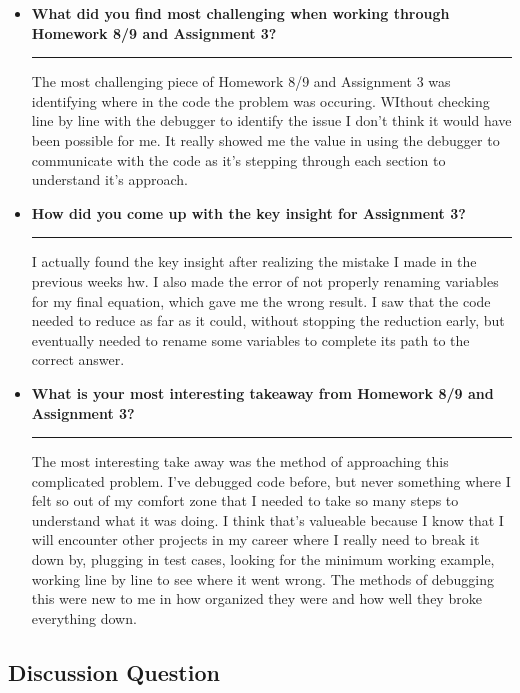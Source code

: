 \documentclass{article}
\begin{document}
\begin{itemize}
    \item \textbf{What did you find most challenging when working through Homework 8/9 and Assignment 3?}
    \vspace{1em}
    
    \rule{\textwidth}{0.5pt} The most challenging piece of Homework 8/9 and Assignment 3 was identifying where in the code the problem was occuring. WIthout checking line by line with the debugger to identify the issue I don't think it would have been possible for me. It really showed me the value in using the debugger to communicate with the code as it's stepping through each section to understand it's approach.

    \item \textbf{How did you come up with the key insight for Assignment 3?}
    \vspace{1em}

    \rule{\textwidth}{0.5pt} I actually found the key insight after realizing the mistake I made in the previous weeks hw. I also made the error of not properly renaming variables for my final equation, which gave me the wrong result. I saw that the code needed to reduce as far as it could, without stopping the reduction early, but eventually needed to rename some variables to complete its path to the correct answer. 

    \item \textbf{What is your most interesting takeaway from Homework 8/9 and Assignment 3?}
    \vspace{1em}

    \rule{\textwidth}{0.5pt} The most interesting take away was the method of approaching this complicated problem. I've debugged code before, but never something where I felt so out of my comfort zone that I needed to take so many steps to understand what it was doing. I think that's valueable because I know that I will encounter other projects in my career where I really need to break it down by, plugging in test cases, looking for the minimum working example, working line by line to see where it went wrong. The methods of debugging this were new to me in how organized they were and how well they broke everything down.  
\end{itemize}

\subsection*{Discussion Question}
\end{document}

